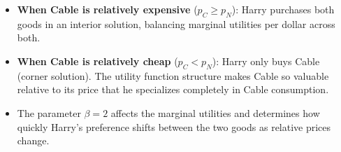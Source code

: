 \documentclass[11pt,a4paper]{article}
\begin{document}
\begin{itemize}[leftmargin=*]
    \item \textbf{When Cable is relatively expensive} ($p_C \geq p_N$): Harry purchases both goods in an interior solution, balancing marginal utilities per dollar across both.

    \item \textbf{When Cable is relatively cheap} ($p_C < p_N$): Harry only buys Cable (corner solution). The utility function structure makes Cable so valuable relative to its price that he specializes completely in Cable consumption.

    \item The parameter $\beta = 2$ affects the marginal utilities and determines how quickly Harry's preference shifts between the two goods as relative prices change.
\end{itemize}
\end{document}

